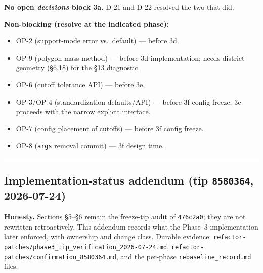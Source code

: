 \documentclass[
  10pt,
]{article}
\providecommand{\tightlist}{%
  \setlength{\itemsep}{0pt}\setlength{\parskip}{0pt}}
\begin{document}
\textbf{No open \emph{decisions} block 3a.} D-21 and D-22 resolved the two that did.

\textbf{Non-blocking (resolve at the indicated phase):}

\begin{itemize}
\tightlist
\item
  OP-2 (support-mode error vs.~default) --- before 3d.
\item
  OP-9 (polygon mass method) --- before 3d implementation; needs district geometry (§6.18) for the §13 diagnostic.
\item
  OP-6 (cutoff tolerance API) --- before 3e.
\item
  OP-3/OP-4 (standardization defaults/API) --- before 3f config freeze; 3c proceeds with the narrow explicit interface.
\item
  OP-7 (config placement of cutoffs) --- before 3f config freeze.
\item
  OP-8 (\texttt{args} removal commit) --- 3f design time.
\end{itemize}

\begin{center}\rule{0.5\linewidth}{0.5pt}\end{center}

\hypertarget{implementation-status-addendum-2026-07-24}{%
\subsection{Implementation-status addendum (tip \texttt{8580364}, 2026-07-24)}\label{implementation-status-addendum-2026-07-24}}

\textbf{Honesty.} Sections §5--§6 remain the freeze-tip audit of
\texttt{476c2a0}; they are not rewritten retroactively. This addendum records
what the Phase~3 implementation later enforced, with ownership and change class.
Durable evidence: \texttt{refactor-patches/phase3\_tip\_verification\_2026-07-24.md},
\texttt{refactor-patches/confirmation\_8580364.md}, and the per-phase
\texttt{rebaseline\_record.md} files.
\end{document}
